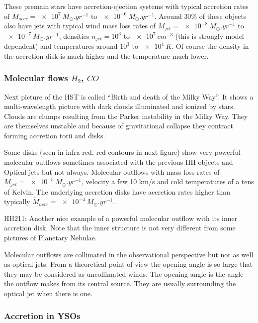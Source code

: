 \documentclass[10pt,a4paper,english,draft]{article}
\begin{document}
These premain stars have accretion-ejection systems with typical accretion
rates of $\dot{M}_{accr}=\SI{e7}{M_\odot.yr^{-1}}$ to $\SI{e-6}{M_{\odot}.yr^{-1}}$.
Around $30\%$ of these objects also have jets with typical wind mass loss rates
of $\dot{M}_{jet}=\SI{e-8}{M_{\odot}.yr^{-1}}$ to $\SI{e-7}{M_{\odot}.yr^{-1}}$, densities
$n_{jet}=10^3$ to $\SI{e7}{cm^{-3}}$ (this is strongly model dependent) and
temperatures around $10^3$ to $\SI{e4}{K}$. Of course the density in the accretion
disk is much higher and the temperature much lower.

\subsubsection{\texorpdfstring{Molecular flows $H_2$, $CO$}{Molecular flows H2, CO}}

Next picture of the HST is called ``Birth and death of the Milky Way''. It shows
a multi-wavelength picture with dark clouds illuminated and ionized by stars.
Clouds are clumps resulting from the Parker instability in the Milky Way. They
are themselves unstable and because of gravitational collapse they contract
forming accretion torii and disks.

Some disks (seen in infra red, red contours in next figure) show very powerful
molecular outflows sometimes associated with the previous HH objects and
Optical jets but not always. Molecular outflows with mass loss rates of
$\dot{M}_{jet}=\SI{e-5}{M_{\odot}.yr^{-1}}$, velocity a few 10 km/s and cold
temperatures of a tens of Kelvin. The underlying accretion disks have accretion
rates higher than typically $\dot{M}_{acrr}=\SI{e-4}{M_{\odot}.yr^{-1}}$.

HH211: Another nice example of a powerful molecular outflow with its inner
accretion disk. Note that the inner structure is not very different from some
pictures of Planetary Nebulae.

Molecular outflows are collimated in the observational perspective but not as
well as optical jets. From a theoretical point of view the opening angle is so
large that they may be considered as uncollimated winds. The opening angle is
the angle the outflow makes from its central source. They are usually
surrounding the optical jet when there is one.

\subsubsection{Accretion in YSOs}
\end{document}
